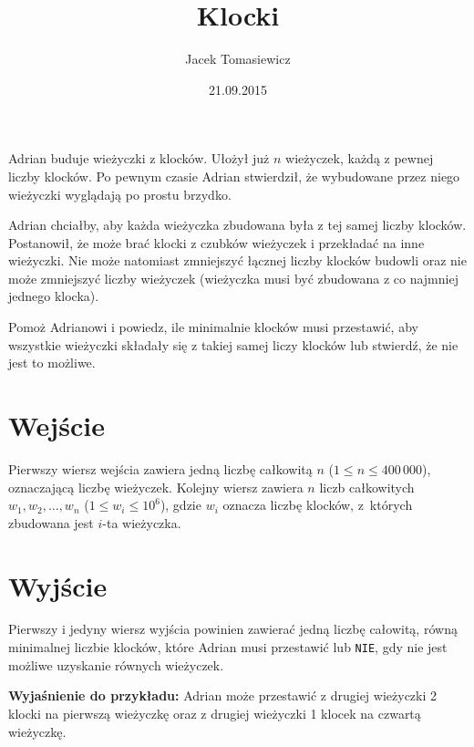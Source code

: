 \documentclass[zad,zawodnik,utf8]{sinol}
\title{Klocki}
\author{Jacek Tomasiewicz}
\date{21.09.2015}
\begin{document}
  \begin{tasktext}%
Adrian buduje wieżyczki z klocków. Ułożył już $n$ wieżyczek, każdą z pewnej liczby  klocków. Po pewnym czasie Adrian stwierdził, że wybudowane przez niego wieżyczki  wyglądają po prostu brzydko.

Adrian chciałby, aby każda wieżyczka zbudowana była z tej samej liczby klocków.  Postanowił, że może brać klocki z czubków wieżyczek i przekładać na inne wieżyczki. Nie może natomiast zmniejszyć łącznej liczby klocków budowli oraz nie może zmniejszyć liczby wieżyczek (wieżyczka musi być zbudowana z co najmniej jednego klocka).

Pomoż Adrianowi i powiedz, ile minimalnie klocków musi przestawić, aby wszystkie wieżyczki składały się z takiej samej liczy klocków lub stwierdź, że nie jest to  możliwe.

  \section{Wejście}

 Pierwszy wiersz wejścia zawiera jedną liczbę całkowitą $n$ ($1 \leq n \leq 400\,000$),  oznaczającą liczbę wieżyczek. Kolejny wiersz zawiera $n$ liczb całkowitych $w_1, w_2,  \ldots, w_n$ ($1 \leq w_i \leq 10^6$), gdzie $w_i$ oznacza liczbę klocków, z~których  zbudowana jest $i$-ta wieżyczka.

  \section{Wyjście}

Pierwszy i jedyny wiersz wyjścia powinien zawierać jedną liczbę całowitą, równą  minimalnej liczbie klocków, które Adrian musi przestawić lub \texttt{NIE}, gdy nie jest możliwe uzyskanie równych wieżyczek.

     \makecompactexample

\medskip
\noindent
\textbf{Wyjaśnienie do przykładu:} Adrian może przestawić z drugiej wieżyczki 2 klocki na  pierwszą wieżyczkę oraz z drugiej wieżyczki 1 klocek na czwartą wieżyczkę.

  \end{tasktext}
\end{document}
